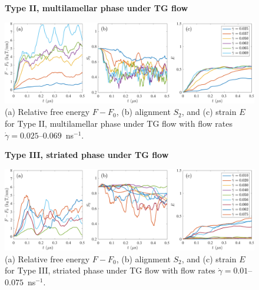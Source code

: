 \begin{figure}[h!]
\begin{center}
\textbf{Type II, multilamellar phase under TG flow}\par\medskip
\includegraphics[width=\textwidth]{FigureS7.pdf}
\end{center}
\caption{(a) Relative free energy $F - F_0$, (b) alignment $S_2$, and
  (c) strain $E$ for Type II, multilamellar phase under TG flow with
  flow rates $\dot\gamma=0.025$--$0.069$~ns$^{-1}$.
}
\label{fig:mltgraw}
\end{figure}


\begin{figure}[h!]
\begin{center}
\textbf{Type III, striated phase under TG flow}\par\medskip
\includegraphics[width=\textwidth]{FigureS8.pdf}
\end{center}
\caption{(a) Relative free energy $F - F_0$, (b) alignment $S_2$, and
  (c) strain $E$ for Type III, striated phase under TG flow with flow
  rates $\dot\gamma=0.01$--$0.075$~ns$^{-1}$.
}
\label{fig:sttgraw}
\end{figure}




